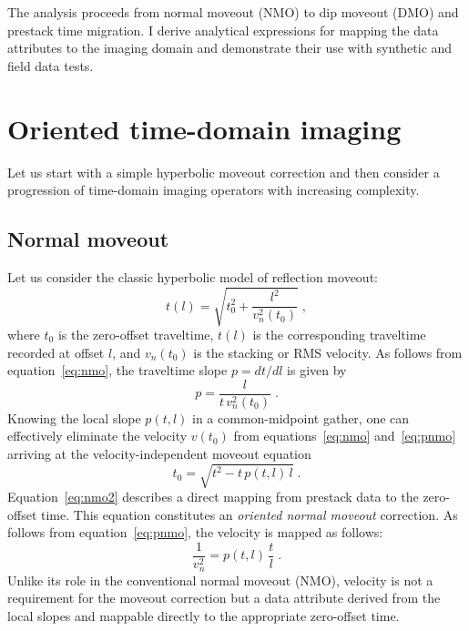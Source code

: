 The analysis proceeds from normal moveout (NMO) to dip moveout (DMO)
and prestack time migration. I derive analytical expressions for
mapping the data attributes to the imaging domain and demonstrate
their use with synthetic and field data tests.

\section{Oriented time-domain imaging}

Let us start with a simple hyperbolic moveout correction and then
consider a progression of time-domain imaging operators with
increasing complexity.

\subsection{Normal moveout}


Let us consider the classic hyperbolic model of reflection moveout:
\begin{equation}
  \label{eq:nmo}
  t(l) = \sqrt{t_0^2 + \frac{l^2}{v_n^2(t_0)}}\;,
\end{equation}
where $t_0$ is the zero-offset traveltime, $t(l)$ is the corresponding
traveltime recorded at offset $l$, and $v_n(t_0)$ is the stacking or
RMS velocity. As follows from equation~\ref{eq:nmo}, the traveltime slope $p= d t/d l$ is given by 
\begin{equation}
  {p} = {\frac{l}{t\,v_n^2(t_0)}}\;.
  \label{eq:pnmo}
\end{equation}
Knowing the local slope $p(t,l)$ in a common-midpoint gather, one can
effectively eliminate the velocity $v(t_0)$ from
equations~\ref{eq:nmo} and~\ref{eq:pnmo} arriving at the
velocity-independent moveout equation \cite[]{Ottolini.sep.37.59}
\begin{equation}
  \label{eq:nmo2}
  t_0 = \sqrt{t^2 - t\,p(t,l)\,l}\;.
\end{equation}
Equation~\ref{eq:nmo2} describes a direct mapping from prestack data
to the zero-offset time. This equation constitutes an \emph{oriented
normal moveout} correction. As follows from equation~\ref{eq:pnmo},
the velocity is mapped as follows:
\begin{equation}
  {\frac{1}{v_n^2}} = p(t,l)\,{\frac{t}{l}}\;. 
  \label{eq:vnmo}
\end{equation}
Unlike its role in the conventional normal moveout (NMO), velocity is
not a requirement for the moveout correction but 
 a data attribute derived from the local slopes and mappable
directly to the appropriate zero-offset time.

